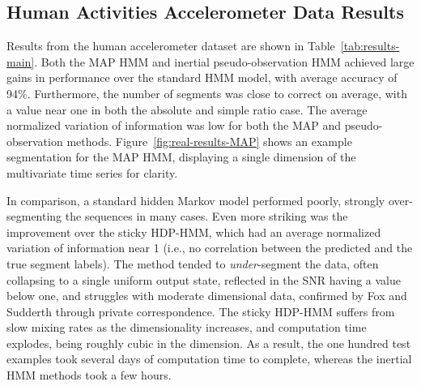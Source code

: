 \documentclass[letterpaper]{article}
\begin{document}
\subsection{Human Activities Accelerometer Data Results}\label{sec:quantitative}

\begin{table}[htbp]
\setlength{\abovecaptionskip}{0pt}
\setlength{\belowcaptionskip}{0cm}
\caption{Results from quantitative evaluation on multivariate human accelerometer data.}
\label{tab:results-main}
\end{table}

Results from the human accelerometer dataset are shown in
Table~\ref{tab:results-main}. Both the MAP HMM and inertial pseudo-observation
HMM achieved large gains in performance over the standard HMM model, with
average accuracy of 94\%. Furthermore, the number of segments was close to
correct on average, with a value near one in both the absolute and simple ratio
case. The average normalized variation of information was low for both the MAP and pseudo-observation methods.
Figure~\ref{fig:real-results-MAP} shows an example segmentation for the MAP HMM, displaying a single dimension of the
multivariate time series for clarity.

In comparison, a standard hidden Markov model performed poorly, strongly over-segmenting the 
sequences in many cases. Even more striking was the improvement over the sticky HDP-HMM, which 
had an average normalized variation of information near 1 (i.e., no correlation between
the predicted and the true segment labels). The method tended to
\emph{under}-segment the data, often collapsing to a single uniform output state, reflected in the SNR 
having a value below one, and struggles with moderate dimensional data, confirmed by Fox and 
Sudderth through private correspondence. The sticky HDP-HMM suffers from slow mixing rates as the
dimensionality increases, and computation time explodes, being roughly cubic in
the dimension. As a result, the one hundred test examples took several days of
computation time to complete, whereas the inertial HMM methods took a few hours.
\end{document}
